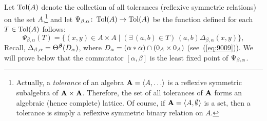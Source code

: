 Let $\operatorname{Tol}(A)$ denote the collection of all tolerances (reflexive symmetric relations)
on the set $A$,\footnote{Actually, a
  \emph{tolerance} of an algebra $\bA = \<A, \dots\>$
  is a reflexive symmetric subalgebra of $\mathbf{A} \times \mathbf{A}$.
  Therefore, the set of all tolerances of $\mathbf{A}$ forms an
  algebraic (hence complete) lattice.
  Of course, if $\mathbf{A} = \langle A, \emptyset\rangle$ is a set, then a tolerance is
  simply a reflexive symmetric binary relation on $A$. 
}
and let %
$\Psi_{\beta, \alpha} \colon \operatorname{Tol}(A) \to \operatorname{Tol}(A)$ be the function defined
for each $T \in  \operatorname{Tol}(A)$ follows:
\begin{equation}
  \label{eq:7}
  \Psi_{\beta, \alpha}(T)
  = \{ (x,y) \in A\times A \mid
  (\exists\, (a,b) \in T)\,
 (a,b) \mathrel{\Delta_{\beta, \alpha}} (x,y)\},
\end{equation}
Recall,
$\Delta_{\beta, \alpha} = \Theta^{\boldsymbol{\beta}}(D_\alpha)$, where
$D_\alpha =(\alpha \ast \alpha) \cap (0_A \times 0_A)$
(see~(\ref{eq:9009})).
We will prove below that the commutator $[\alpha, \beta]$ is the least fixed
point of $\Psi_{\beta, \alpha}$.

